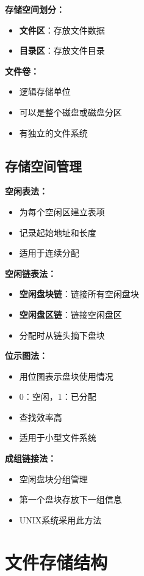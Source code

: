 \documentclass[lang=cn,newtx,10pt,scheme=chinese]{../../elegantbook}
\begin{document}
\textbf{存储空间划分：}
\begin{itemize}
  \item \textbf{文件区}：存放文件数据
  \item \textbf{目录区}：存放文件目录
\end{itemize}

\textbf{文件卷：}
\begin{itemize}
  \item 逻辑存储单位
  \item 可以是整个磁盘或磁盘分区
  \item 有独立的文件系统
\end{itemize}

\subsection{存储空间管理}

\textbf{空闲表法：}
\begin{itemize}
  \item 为每个空闲区建立表项
  \item 记录起始地址和长度
  \item 适用于连续分配
\end{itemize}

\textbf{空闲链表法：}
\begin{itemize}
  \item \textbf{空闲盘块链}：链接所有空闲盘块
  \item \textbf{空闲盘区链}：链接空闲盘区
  \item 分配时从链头摘下盘块
\end{itemize}

\textbf{位示图法：}
\begin{itemize}
  \item 用位图表示盘块使用情况
  \item 0：空闲，1：已分配
  \item 查找效率高
  \item 适用于小型文件系统
\end{itemize}

\textbf{成组链接法：}
\begin{itemize}
  \item 空闲盘块分组管理
  \item 第一个盘块存放下一组信息
  \item UNIX系统采用此方法
\end{itemize}

\section{文件存储结构}
\end{document}
